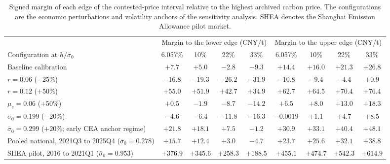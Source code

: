 \documentclass[5p,times,authoryear]{elsarticle}
\theoremstyle{plain}
\newcommand{\sbar}{\bar{\sigma}_0}
\begin{document}
\begin{table}[!t]
\caption{Signed margin of each edge of the contested-price interval relative to the highest archived carbon price. The configurations are the economic perturbations and volatility anchors of the sensitivity analysis. SHEA denotes the Shanghai Emission Allowance pilot market.}
\label{tab:margins}
\centering
\footnotesize
\setlength{\tabcolsep}{4pt}
\begin{tabular}{@{}lcccccccc@{}}
\toprule
 & \multicolumn{4}{c}{Margin to the lower edge (CNY/t)} & \multicolumn{4}{c}{Margin to the upper edge (CNY/t)}\\
\cmidrule(lr){2-5}\cmidrule(l){6-9}
Configuration at $h/\sbar$ & 6.057\% & 10\% & 22\% & 33\% & 6.057\% & 10\% & 22\% & 33\%\\
\midrule
Baseline calibration & $+7.7$ & $+5.0$ & $-2.8$ & $-9.3$ & $+14.4$ & $+16.0$ & $+21.3$ & $+26.8$\\
$r=0.06$ ($-25\%$) & $-16.8$ & $-19.3$ & $-26.2$ & $-31.9$ & $-10.8$ & $-9.4$ & $-4.4$ & $+0.9$\\
$r=0.12$ ($+50\%$) & $+55.0$ & $+51.9$ & $+42.7$ & $+34.9$ & $+62.7$ & $+64.5$ & $+70.4$ & $+76.4$\\
$\mu_c=0.06$ ($+50\%$) & $+0.5$ & $-1.9$ & $-8.7$ & $-14.2$ & $+6.5$ & $+8.0$ & $+13.0$ & $+18.3$\\
$\sbar=0.199$ ($-20\%$) & $-4.6$ & $-6.4$ & $-11.8$ & $-16.3$ & $-0.0019$ & $+1.1$ & $+4.7$ & $+8.5$\\
$\sbar=0.299$ ($+20\%$; early CEA anchor regime) & $+21.8$ & $+18.1$ & $+7.5$ & $-1.2$ & $+30.9$ & $+33.1$ & $+40.4$ & $+48.1$\\
Pooled national, 2021Q3 to 2025Q4 ($\sbar=0.278$) & $+15.7$ & $+12.4$ & $+3.0$ & $-4.7$ & $+23.7$ & $+25.6$ & $+32.1$ & $+38.8$\\
SHEA pilot, 2016 to 2021Q1 ($\sbar=0.953$) & $+376.9$ & $+345.6$ & $+258.3$ & $+188.5$ & $+455.1$ & $+474.7$ & $+542.3$ & $+614.9$\\
\bottomrule
\end{tabular}
\par\smallskip

\end{table}
\end{document}
